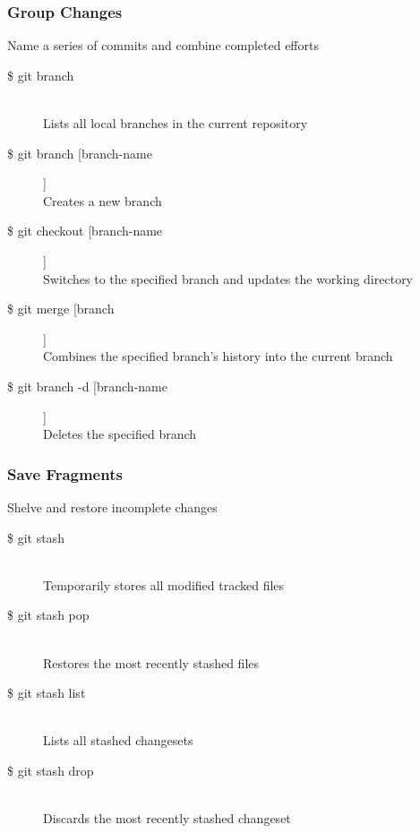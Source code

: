 \subsubsection{Group Changes}
Name a series of commits and combine completed efforts

\begin{description}

\item [\$ git branch] \leavevmode \\
Lists all local branches in the current repository

\item [\$ git branch [branch-name]]\\
Creates a new branch

\item [\$ git checkout [branch-name]]\\
Switches to the specified branch and updates the working directory

\item [\$ git merge [branch]]\\
Combines the specified branch’s history into the current branch

\item [\$ git branch -d [branch-name]]\\
Deletes the specified branch\\

\end{description}


\subsubsection{Save Fragments}
Shelve and restore incomplete changes

\begin{description}

\item [\$ git stash] \leavevmode \\
Temporarily stores all modified tracked files

\item [\$ git stash pop] \leavevmode \\
Restores the most recently stashed files

\item [\$ git stash list] \leavevmode \\
Lists all stashed changesets

\item [\$ git stash drop] \leavevmode \\
Discards the most recently stashed changeset\\

\end{description}


